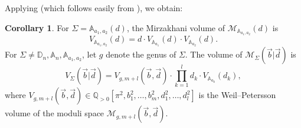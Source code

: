 \documentclass{amsart}
\theoremstyle{definition}
\newtheorem{corollary}[proposition]{Corollary}
\begin{document}
Applying \cite[Lemma~2.6]{chekhov2024} (which follows easily from ), we obtain:
\begin{corollary}
\label{cor:fixedneckvolumegeneral}
For $\Sigma=\mathbb{A}_{a_1,a_2}(d)$, the Mirzakhani volume of $\mathcal{M}_{\mathbb{A}_{a_1,a_2}}(d)$ is
    \[
    V_{\mathbb{A}_{a_1,a_2}}(d)
    =
    d\cdot V_{\mathbb{A}_{a_1}}(d)\cdot V_{\mathbb{A}_{a_2}}(d).
    \]
    For $\Sigma\neq\mathbb{D}_n,\mathbb{A}_n,\mathbb{A}_{a_1,a_2}$, let $g$ denote the genus of $\Sigma$. The volume of $\mathcal{M}_\Sigma(\vec{b}|\vec{d})$ is
    \[
    V_\Sigma(\vec{b}|\vec{d})
    =
    V_{g,m+l}(\vec{b},\vec{d})
    \cdot
    \prod_{k=1}^{l}d_k \cdot V_{\mathbb{A}_{a_k}}(d_k),
    \]
    where $V_{g,m+l}(\vec{b},\vec{d})\in\mathbb{Q}_{>0}[\pi^2,b_1^2,\ldots,b_m^2,d_1^2,\ldots,d_l^2]$ is the Weil--Petersson volume of the moduli space $\mathcal{M}_{g,m+l}(\vec{b},\vec{d})$.
\end{corollary}
\end{document}
